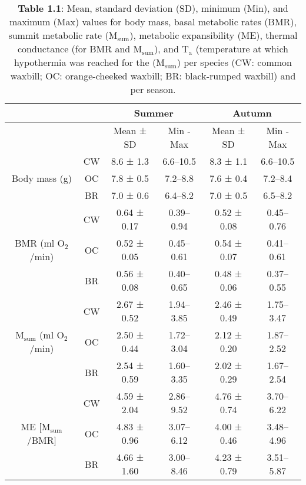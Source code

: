 \documentclass[10pt, twoside]{book} %
\begin{document}
\begin{sidewaystable}[!ht]
\begin{center}
\begin{footnotesize}
\footnotesize
\caption*{\textbf{Table 1.1}: Mean, standard deviation (SD), minimum (Min), and maximum (Max) values for body mass, basal metabolic rates (BMR), summit metabolic rate (M$_{\text{sum}}$), metabolic expansibility (ME), thermal conductance (for BMR and M$_{\text{sum}}$), and T$_{\text{a}}$ (temperature at which hypothermia was reached for the (M$_{\text{sum}}$) per species (CW: common waxbill; OC: orange-cheeked waxbill; BR: black-rumped waxbill) and per season.}
\centering
    \begin{tabular}{cccccc}
    \hline
        \textbf{} & \textbf{} & \multicolumn{2}{c}{\textbf{Summer}} & \multicolumn{2}{c}{\textbf{Autumn}} \\ \hline
        ~ & ~ & \multicolumn{1}{c}{Mean ± SD} & \multicolumn{1}{c|}{Min - Max} & \multicolumn{1}{c}{Mean ± SD} & \multicolumn{1}{c}{Min - Max} \\ \hline
        \multirow{3}{*}{Body mass (g)} & CW & 8.6 ± 1.3 & 6.6–10.5 & 8.3 ± 1.1 & 6.6–10.5 \\ \cline{2-6}
        ~ & OC & 7.8 ± 0.5 & 7.2–8.8 & 7.6 ± 0.4 & 7.2–8.4 \\ \cline{2-6}
        ~ & BR & 7.0 ± 0.6 & 6.4–8.2 & 7.0 ± 0.5 & 6.5–8.2 \\ \hline
        \multirow{3}{*}{BMR (ml O$_{\text{2}}$/min)} & CW & 0.64 ± 0.17 & 0.39–0.94 & 0.52 ± 0.08 & 0.45–0.76 \\ \cline{2-6}
        ~ & OC & 0.52 ± 0.05 & 0.45–0.61 & 0.54 ± 0.07 & 0.41–0.61 \\ \cline{2-6}
        ~ & BR & 0.56 ± 0.08 & 0.40–0.65 & 0.48 ± 0.06 & 0.37–0.55 \\ \hline
        \multirow{3}{*}{M$_{\text{sum}}$ (ml O$_{\text{2}}$/min)} & CW & 2.67 ± 0.52 & 1.94–3.85 & 2.46 ± 0.49 & 1.75–3.47 \\ \cline{2-6}
        ~ & OC & 2.50 ± 0.44 & 1.72–3.04 & 2.12 ± 0.20 & 1.87–2.52 \\ \cline{2-6}
        ~ & BR & 2.54 ± 0.59 & 1.60–3.35 & 2.02 ± 0.29 & 1.67–2.54 \\ \hline
        \multirow{3}{*}{ME [M$_{\text{sum}}$/BMR]} & CW & 4.59 ± 2.04 & 2.86–9.52 & 4.76 ± 0.74 & 3.70–6.22 \\ \cline{2-6}
        ~ & OC & 4.83 ± 0.96 & 3.07–6.12 & 4.00 ± 0.46 & 3.48–4.96 \\ \cline{2-6}
        ~ & BR & 4.66 ± 1.60 & 3.00–8.46 & 4.23 ± 0.79 & 3.51–5.87 \\ \hline

\end{tabular}
\end{footnotesize}
\end{center}
\end{sidewaystable}
\end{document}
